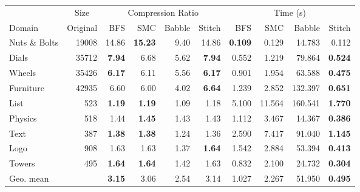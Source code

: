 \begin{tabular}{l r rrrr rrrr}
\toprule
& \multicolumn{1}{c}{Size} & \multicolumn{4}{c}{Compression Ratio} & \multicolumn{4}{c}{Time (s)} \\
\cmidrule(lr){2-2} \cmidrule(lr){3-6} \cmidrule(lr){7-10}
Domain & Original & BFS & SMC & Babble & Stitch & BFS & SMC & Babble & Stitch \\
\midrule
Nuts \& Bolts & 19008 & 14.86 & \textbf{15.23} & 9.40 & 14.86 & \textbf{0.109} & 0.129 & 14.783 & 0.112 \\
Dials & 35712 & \textbf{7.94} & 6.68 & 5.62 & \textbf{7.94} & 0.552 & 1.219 & 79.864 & \textbf{0.524} \\
Wheels & 35426 & \textbf{6.17} & 6.11 & 5.56 & \textbf{6.17} & 0.901 & 1.954 & 63.588 & \textbf{0.475} \\
Furniture & 42935 & 6.60 & 6.00 & 4.02 & \textbf{6.64} & 1.239 & 2.852 & 132.397 & \textbf{0.651} \\
List & 523 & \textbf{1.19} & \textbf{1.19} & 1.09 & 1.18 & 5.100 & 11.564 & 160.541 & \textbf{1.770} \\
Physics & 518 & 1.44 & \textbf{1.45} & 1.43 & 1.43 & 1.112 & 3.467 & 14.367 & \textbf{0.386} \\
Text & 387 & \textbf{1.38} & \textbf{1.38} & 1.24 & 1.36 & 2.590 & 7.417 & 91.040 & \textbf{1.145} \\
Logo & 908 & 1.63 & 1.63 & 1.37 & \textbf{1.64} & 1.542 & 2.884 & 53.394 & \textbf{0.413} \\
Towers & 495 & \textbf{1.64} & \textbf{1.64} & 1.42 & 1.63 & 0.832 & 2.100 & 24.732 & \textbf{0.304} \\
\midrule
Geo. mean &  & \textbf{3.15} & 3.06 & 2.54 & 3.14 & 1.027 & 2.267 & 51.950 & \textbf{0.495} \\
\bottomrule
\end{tabular}
